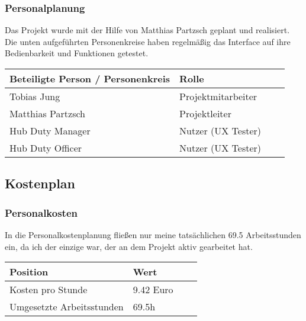 	\subsubsection{Personalplanung}
	Das Projekt wurde mit der Hilfe von Matthias Partzsch geplant und realisiert. Die unten aufgeführten Personenkreise haben regelmäßig das Interface auf ihre Bedienbarkeit und Funktionen getestet.
\\

	\begin{table}[htp]

		\begin{center}
			\begin{tabular}{llll} \toprule
				Beteiligte Person / Personenkreis & Rolle\\ \bottomrule
				Tobias Jung & Projektmitarbeiter \\
				Matthias Partzsch & Projektleiter \\
				Hub Duty Manager & Nutzer (UX Tester) \\
				Hub Duty Officer & Nutzer (UX Tester) \\ \bottomrule
			\end{tabular}
		\end{center}
	\end{table}


	\subsection{Kostenplan}

	\subsubsection{Personalkosten}
	In die Personalkostenplanung fließen nur meine tatsächlichen 69.5 Arbeitsstunden ein, da ich der einzige war, der an dem Projekt aktiv gearbeitet hat.\\

	\begin{table}[htp]

		\begin{center}
			\begin{tabular}{llll} \toprule
				Position & Wert \\ \bottomrule
				Kosten pro Stunde & 9.42 Euro \\
				Umgesetzte Arbeitsstunden & 69.5h \\ \bottomrule
			\end{tabular}
		\end{center}
	\end{table}
	
